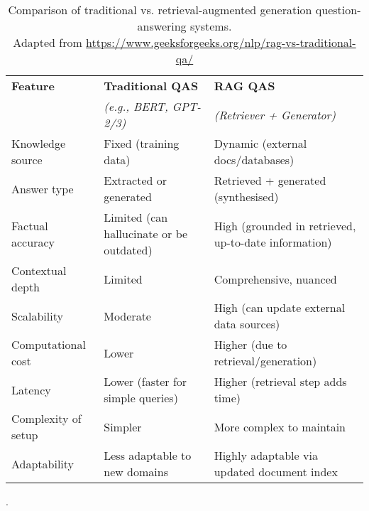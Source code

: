 \begin{spacing}{1.5}
\addtocounter{table}{-1}
\begin{table}[H]
\centering
\begin{tabularx}{\textwidth}{l>{\raggedright\arraybackslash}X>{\raggedright\arraybackslash}X}
\toprule
\textbf{Feature} & \textbf{Traditional QAS} & \textbf{RAG QAS} \\
& \textit{(e.g., BERT, GPT-2/3)} & \textit{(Retriever + Generator)} \\
\midrule
Knowledge source & Fixed (training data) & Dynamic (external docs/databases) \\
Answer type & Extracted or generated & Retrieved + generated (synthesised) \\
Factual accuracy & Limited (can hallucinate or be outdated) & High (grounded in retrieved, up-to-date information) \\
Contextual depth & Limited & Comprehensive, nuanced \\
Scalability & Moderate & High (can update external data sources) \\
Computational cost & Lower & Higher (due to retrieval/generation) \\
Latency & Lower (faster for simple queries) & Higher (retrieval step adds time) \\
Complexity of setup & Simpler & More complex to maintain \\
Adaptability & Less adaptable to new domains & Highly adaptable via updated document index \\
\bottomrule
\end{tabularx}
\vspace{0.5em}
\caption{Comparison of traditional vs. retrieval-augmented generation question-answering systems.\\ \footnotesize{Adapted from \url{https://www.geeksforgeeks.org/nlp/rag-vs-traditional-qa/}\nocite{noauthor_rag_2025}}}.
\label{tab:qa-comparison}
\end{table}

\end{spacing}
